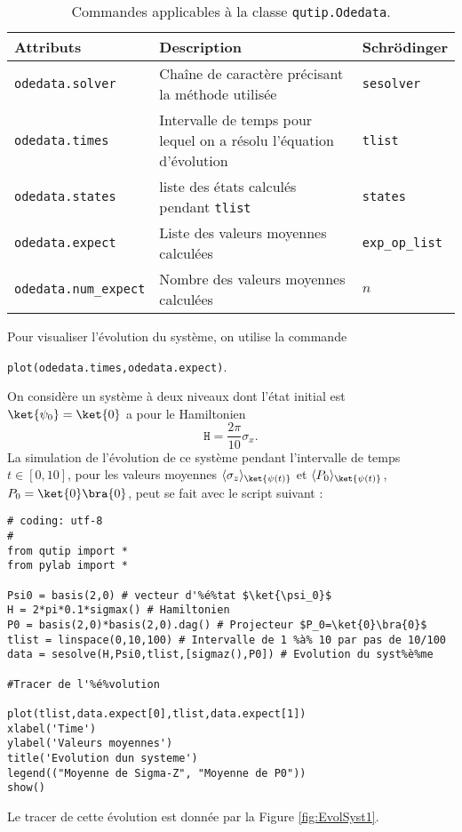 \begin{table}[htp]
\centering
\begin{tabular}{|l|p{7cm}|l|} \hline \hline
\textbf{Attributs} & \textbf{Description} & \textbf{Schrödinger}\\ \hline \hline
\texttt{odedata.solver} & Chaîne de caractère précisant la méthode utilisée & 
\texttt{sesolver}\\ \hline
\texttt{odedata.times} & Intervalle de temps pour lequel on a résolu 
l'équation d'évolution & \texttt{tlist}\\ \hline
\texttt{odedata.states} & liste des états calculés pendant \texttt{tlist} & 
\texttt{states} \\ \hline
\texttt{odedata.expect} & Liste des valeurs moyennes calculées & 
\texttt{exp\_op\_list} \\ \hline
\texttt{odedata.num\_expect} & Nombre des valeurs moyennes calculées & $n$ \\ 
\hline
\end{tabular}
\caption{Commandes applicables à la classe \texttt{qutip.Odedata}.}
\label{tab:Odedata}
\end{table}

Pour visualiser l'évolution du système, on utilise la commande 
\begin{center}
\texttt{plot(odedata.times,odedata.expect)}.
\end{center}

\begin{example}
On considère un système à deux niveaux dont l'état initial est 
$\ket{\psi_0}=\ket{0}$ a pour le Hamiltonien
\begin{equation}
\mathtt{H} = \frac{2\pi}{10}\sigma_x.
\end{equation}
La simulation de l'évolution de ce système pendant l'intervalle de temps 
$t\in[0,10]$, pour les valeurs moyennes $\av{\sigma_z}_{\ket{\psi(t)}}$ et 
$\av{P_0}_{\ket{\psi(t)}}$, $P_0=\ket{0}\bra{0}$, peut se fait avec le 
script suivant :
\end{example}
\begin{lstlisting}[commentstyle=\scriptsize]
# coding: utf-8 
#
from qutip import *
from pylab import *

Psi0 = basis(2,0) # vecteur d'%é%tat $\ket{\psi_0}$
H = 2*pi*0.1*sigmax() # Hamiltonien
P0 = basis(2,0)*basis(2,0).dag() # Projecteur $P_0=\ket{0}\bra{0}$
tlist = linspace(0,10,100) # Intervalle de 1 %à% 10 par pas de 10/100
data = sesolve(H,Psi0,tlist,[sigmaz(),P0]) # Evolution du syst%è%me

#Tracer de l'%é%volution

plot(tlist,data.expect[0],tlist,data.expect[1])
xlabel('Time')
ylabel('Valeurs moyennes')
title('Evolution dun systeme')
legend(("Moyenne de Sigma-Z", "Moyenne de P0"))
show()
\end{lstlisting}
Le tracer de cette évolution est donnée par la Figure \ref{fig:EvolSyst1}.

